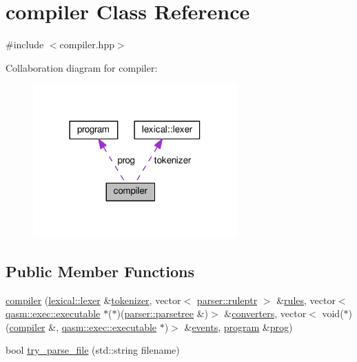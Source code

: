 \hypertarget{classcompiler}{}\section{compiler Class Reference}
\label{classcompiler}


{\ttfamily \#include $<$compiler.\+hpp$>$}



Collaboration diagram for compiler\+:\nopagebreak
\begin{figure}[H]
\begin{center}
\leavevmode
\includegraphics[width=222pt]{classcompiler__coll__graph}
\end{center}
\end{figure}
\subsection*{Public Member Functions}
\begin{DoxyCompactItemize}
\item 
\hyperlink{classcompiler_aac603e3e8c3851dfb420e6e007adbad0}{compiler} (\hyperlink{classlexical_1_1lexer}{lexical\+::lexer} \&\hyperlink{classcompiler_a888ac16dbb82fa8a9500633addcd22ba}{tokenizer}, vector$<$ \hyperlink{namespaceparser_a85b2df48287fddaca144a5f6c01b4761}{parser\+::ruleptr} $>$ \&\hyperlink{classcompiler_a1b712963929882f359df919ce73bbf4e}{rules}, vector$<$ \hyperlink{classqasm_1_1exec_1_1executable}{qasm\+::exec\+::executable} $\ast$($\ast$)(\hyperlink{structparser_1_1parsetree}{parser\+::parsetree} \&)$>$ \&\hyperlink{classcompiler_a76cbb22ce5238f2fd9b3946f541dba0c}{converters}, vector$<$ void($\ast$)(\hyperlink{classcompiler}{compiler} \&, \hyperlink{classqasm_1_1exec_1_1executable}{qasm\+::exec\+::executable} $\ast$)$>$ \&\hyperlink{classcompiler_aa9d1b362adff0ca48511cf824ca1fe4c}{events}, \hyperlink{classprogram}{program} \&\hyperlink{classcompiler_a801700690bf711169679cb6ca890168a}{prog})
\item 
bool \hyperlink{classcompiler_af3984a0a53279c28bee8aee4b0ef84ca}{try\+\_\+parse\+\_\+file} (std\+::string filename)
\end{DoxyCompactItemize}
